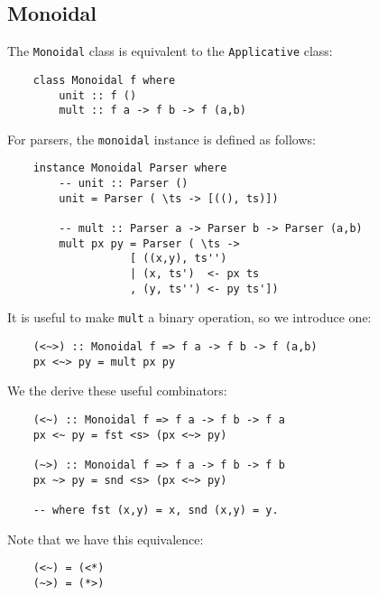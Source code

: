 \documentclass[a4paper,12pt]{article}
\theoremstyle{remark}
\begin{document}
\subsection{Monoidal}

The \lstinline{Monoidal} class is equivalent to the \lstinline{Applicative} class:

\begin{lstlisting}
    class Monoidal f where
        unit :: f ()
        mult :: f a -> f b -> f (a,b)  \end{lstlisting}

For parsers, the \lstinline{monoidal} instance is defined as follows:

\begin{lstlisting}
    instance Monoidal Parser where
        -- unit :: Parser ()
        unit = Parser ( \ts -> [((), ts)])

        -- mult :: Parser a -> Parser b -> Parser (a,b)
        mult px py = Parser ( \ts ->
                   [ ((x,y), ts'')
                   | (x, ts')  <- px ts
                   , (y, ts'') <- py ts'])  \end{lstlisting}

\begin{figure}[H]
  \centering
\end{figure}

It is useful to make \lstinline{mult} a binary operation, so we introduce one:

\begin{lstlisting}
    (<~>) :: Monoidal f => f a -> f b -> f (a,b)
    px <~> py = mult px py  \end{lstlisting}

We the derive these useful combinators:

\begin{lstlisting}
    (<~) :: Monoidal f => f a -> f b -> f a
    px <~ py = fst <s> (px <~> py)

    (~>) :: Monoidal f => f a -> f b -> f b
    px ~> py = snd <s> (px <~> py)

    -- where fst (x,y) = x, snd (x,y) = y.  \end{lstlisting}

Note that we have this equivalence:

\begin{lstlisting}
    (<~) = (<*)
    (~>) = (*>)  \end{lstlisting}
\end{document}
